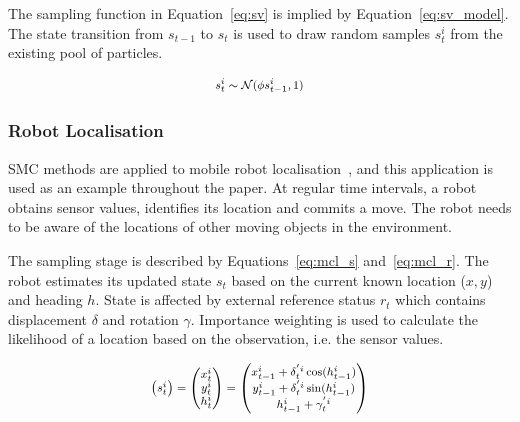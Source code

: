 The sampling function in Equation~\ref{eq:sv} is implied by Equation~\ref{eq:sv_model}.
The state transition from $s_{t-1}$ to $s_t$ is used to draw random samples $s^i_t$ from the existing pool of particles.

\begin{equation}
\footnotesize
\begin{aligned}
	s^i_{t} \sim \mathcal{N}(\phi s^i_{t-1},1)
\end{aligned}
\label{eq:sv}
\end{equation}

\subsubsection{Robot Localisation}
SMC methods are applied to mobile robot localisation~\cite{montemerlo02},
and this application is used as an example throughout the paper.
At regular time intervals, a robot obtains sensor values, identifies its location and commits a move.
The robot needs to be aware of the locations of other moving objects in the environment.

The sampling stage is described by Equations~\ref{eq:mcl_s} and~\ref{eq:mcl_r}. 
The robot estimates its updated state $s_t$ based on the current known location ($x, y$) and heading $h$.
State is affected by external reference status $r_t$ which contains displacement $\delta$ and rotation $\gamma$.
Importance weighting is used to calculate the likelihood of a location based on the observation, i.e. the sensor values.

\begin{equation}
\footnotesize
\begin{aligned}
  \begin{pmatrix}
    s^i_{t}    \\ 
  \end{pmatrix}
  =
  \begin{pmatrix}
    x^i_{t}    \\ 
    y^i_{t}    \\ 
    h^i_{t}    \\ 
  \end{pmatrix}
  =
  \begin{pmatrix}
  	x^i_{t-1} + \delta^{'i}_{t} \cos(h^i_{t-1}) \\
		y^i_{t-1} + \delta^{'i}_{t} \sin(h^i_{t-1}) \\
		h^i_{t-1} + \gamma^{'i}_{t} \\
  \end{pmatrix}
\end{aligned}
\label{eq:mcl_s}
\end{equation}

